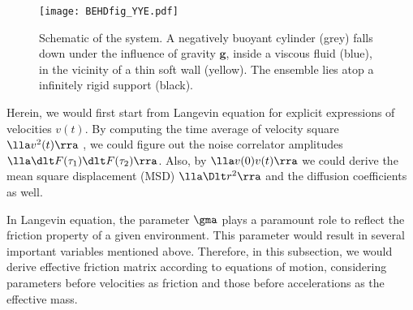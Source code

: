 \documentclass[fleqn,10pt]{InternshipReport-ENS-PSL}
\begin{document}
\begin{figure}[ht]
\centering
\texttt{[image: BEHDfig\_YYE.pdf]}
\caption{Schematic of the system. A negatively buoyant cylinder (grey) falls down under the influence of gravity $\mathbf{g}$, inside a viscous fluid (blue), in the vicinity of a thin soft wall (yellow). The ensemble lies atop a infinitely rigid support (black).}
\label{BEHDfig}
\end{figure}


Herein, we would first start from Langevin equation for explicit expressions of velocities $v(t)$. By computing the time average of velocity square $\lla v^2(t) \rra$ , we could figure out the noise correlator amplitudes $\lla \dlt F(\tau_1) \dlt F(\tau_2) \rra$. Also, by $\lla v(0) v(t) \rra$ we could derive the mean square displacement (MSD) $\lla \Dlt r^2 \rra$ and the diffusion coefficients as well.
\begin{center}
\end{center}


In Langevin equation, the parameter $\gma$ plays a paramount role to reflect the friction property of a given environment. This parameter would result in several important variables mentioned above. Therefore, in this subsection, we would derive effective friction matrix according to equations of motion, considering parameters before velocities as friction and those before accelerations as the effective mass.
\end{document}

